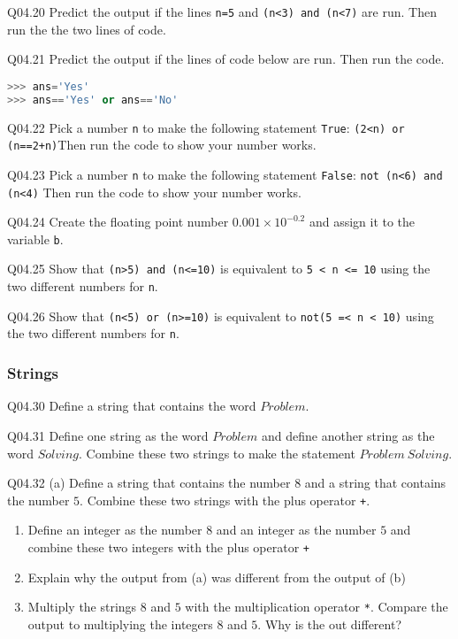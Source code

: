 \documentclass{book}
\newcommand{\passthrough}[1]{#1}
\begin{document}
Q04.20 Predict the output if the lines \passthrough{\lstinline!n=5!} and
\passthrough{\lstinline!(n<3) and (n<7)!} are run. Then run the the two
lines of code.

Q04.21 Predict the output if the lines of code below are run. Then run
the code.

\begin{lstlisting}[language=Python]
>>> ans='Yes'
>>> ans=='Yes' or ans=='No'
\end{lstlisting}

Q04.22 Pick a number \passthrough{\lstinline!n!} to make the following
statement \passthrough{\lstinline!True!}:
\passthrough{\lstinline!(2<n) or (n==2+n)!}Then run the code to show
your number works.

Q04.23 Pick a number \passthrough{\lstinline!n!} to make the following
statement \passthrough{\lstinline!False!}:
\passthrough{\lstinline!not (n<6) and (n<4)!} Then run the code to show
your number works.

Q04.24 Create the floating point number \(0.001 \times 10^{-0.2}\) and
assign it to the variable \passthrough{\lstinline!b!}.

Q04.25 Show that \passthrough{\lstinline!(n>5) and (n<=10)!} is
equivalent to \passthrough{\lstinline!5 < n <= 10!} using the two
different numbers for \passthrough{\lstinline!n!}.

Q04.26 Show that \passthrough{\lstinline!(n<5) or (n>=10)!} is
equivalent to \passthrough{\lstinline!not(5 =< n < 10)!} using the two
different numbers for \passthrough{\lstinline!n!}.
    




    
        \hypertarget{strings}{%
\subsubsection{Strings}\label{strings}}

Q04.30 Define a string that contains the word \(Problem\).

Q04.31 Define one string as the word \(Problem\) and define another
string as the word \(Solving\). Combine these two strings to make the
statement \(Problem \ Solving\).

Q04.32 (a) Define a string that contains the number \(8\) and a string
that contains the number \(5\). Combine these two strings with the plus
operator \passthrough{\lstinline!+!}.

\begin{enumerate}
\def\labelenumi{(\alph{enumi})}
\setcounter{enumi}{1}
\item
  Define an integer as the number \(8\) and an integer as the number
  \(5\) and combine these two integers with the plus operator
  \passthrough{\lstinline!+!}
\item
  Explain why the output from (a) was different from the output of (b)
\item
  Multiply the strings \(8\) and \(5\) with the multiplication operator
  \passthrough{\lstinline!*!}. Compare the output to multiplying the
  integers \(8\) and \(5\). Why is the out different?
\end{enumerate}
\end{document}
